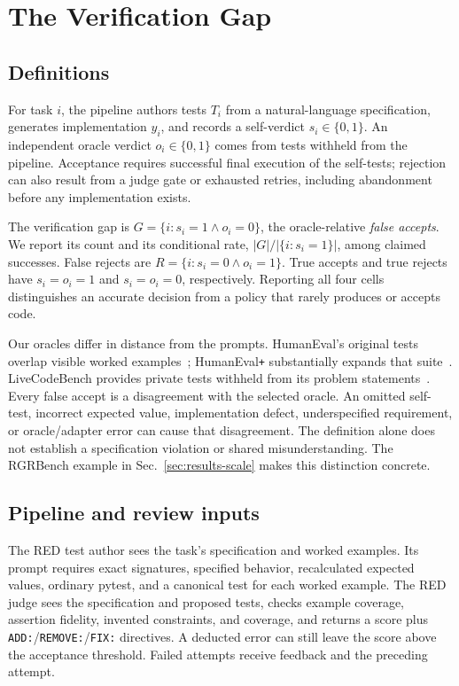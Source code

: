 \section{The Verification Gap}
\label{sec:gap}

\subsection{Definitions}
For task $i$, the pipeline authors tests $T_i$ from a natural-language specification,
generates implementation $y_i$, and records a self-verdict $s_i\in\{0,1\}$.
An independent oracle verdict $o_i\in\{0,1\}$ comes from tests withheld from the
pipeline. Acceptance requires successful final execution of the self-tests;
rejection can also result from a judge gate or exhausted retries, including
abandonment before any implementation exists.

The verification gap is $G=\{i:s_i=1\wedge o_i=0\}$, the oracle-relative
\emph{false accepts}. We report its count and its conditional rate,
$|G|/|\{i:s_i=1\}|$, among claimed successes. False rejects are
$R=\{i:s_i=0\wedge o_i=1\}$. True accepts and true rejects have
$s_i=o_i=1$ and $s_i=o_i=0$, respectively. Reporting all four cells distinguishes
an accurate decision from a policy that rarely produces or accepts code.

Our oracles differ in distance from the prompts. HumanEval's original tests
overlap visible worked examples~\cite{chen2021humaneval}; HumanEval\texttt{+}
substantially expands that suite~\cite{liu2023evalplus}. LiveCodeBench provides
private tests withheld from its problem statements~\cite{jain2024livecodebench}.
Every false accept is a disagreement with the selected oracle. An omitted
self-test, incorrect expected value, implementation defect, underspecified
requirement, or oracle/adapter error can cause that disagreement. The definition
alone does not establish a specification violation or shared misunderstanding.
The RGRBench example in Sec.~\ref{sec:results-scale} makes this distinction concrete.

\subsection{Pipeline and review inputs}
\label{sec:prompts}
The RED test author sees the task's specification and worked examples. Its prompt
requires exact signatures, specified behavior, recalculated expected values,
ordinary pytest, and a canonical test for each worked example. The RED judge sees
the specification and proposed tests, checks example coverage, assertion fidelity,
invented constraints, and coverage, and returns a score plus
\texttt{ADD:}/\texttt{REMOVE:}/\texttt{FIX:} directives. A deducted error can still
leave the score above the acceptance threshold. Failed attempts receive feedback
and the preceding attempt.

